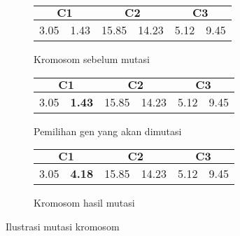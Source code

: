 \begin{figure}[H]
	\centering
	\begin{subfigure}[t]{\textwidth}
		\centering
		\begin{tabular}{|c|c|c|c|c|c|}
			\multicolumn{2}{c}{\textbf{$\mathbf{C1}$}} & \multicolumn{2}{c}{\textbf{$\mathbf{C2}$}} & \multicolumn{2}{c}{$\mathbf{C3}$}\\ \hline
		3.05 & 1.43 & 15.85 & 14.23 & 5.12 & 9.45\\ \hline
		\end{tabular}
		\caption{Kromosom sebelum mutasi}
		\label{fig:mutated:before}
	\end{subfigure}
	
	\vspace{5mm}
	\begin{subfigure}[t]{\textwidth}
		\centering
		\begin{tabular}{|c|c|c|c|c|c|}
			\multicolumn{2}{c}{\textbf{$\mathbf{C1}$}} & \multicolumn{2}{c}{\textbf{$\mathbf{C2}$}} & \multicolumn{2}{c}{$\mathbf{C3}$}\\ \hline
		3.05 & \textbf{1.43} & 15.85 & 14.23 & 5.12 & 9.45\\ \hline
		\end{tabular}
		\caption{Pemilihan gen yang akan dimutasi}
		\label{fig:mutated:choose}
	\end{subfigure}
	
	\vspace{5mm}
	\begin{subfigure}[t]{\textwidth}
		\centering
		\begin{tabular}{|c|c|c|c|c|c|}
			\multicolumn{2}{c}{\textbf{$\mathbf{C1}$}} & \multicolumn{2}{c}{\textbf{$\mathbf{C2}$}} & \multicolumn{2}{c}{$\mathbf{C3}$}\\ \hline
		3.05 & {\color{red} \textbf{4.18}} & 15.85 & 14.23 & 5.12 & 9.45\\ \hline
		\end{tabular}
		\caption{Kromosom hasil mutasi}
		\label{fig:mutated:after}
	\end{subfigure}
		\caption{Ilustrasi mutasi kromosom}
		\label{fig:mutated}
\end{figure}

%
